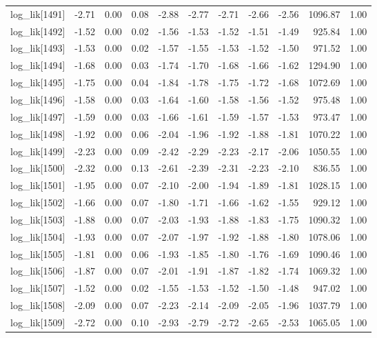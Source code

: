 \begin{table}[ht]
\begin{tabular}{rrrrrrrrrrr}
  log\_lik[1491] & -2.71 & 0.00 & 0.08 & -2.88 & -2.77 & -2.71 & -2.66 & -2.56 & 1096.87 & 1.00 \\ 
  log\_lik[1492] & -1.52 & 0.00 & 0.02 & -1.56 & -1.53 & -1.52 & -1.51 & -1.49 & 925.84 & 1.00 \\ 
  log\_lik[1493] & -1.53 & 0.00 & 0.02 & -1.57 & -1.55 & -1.53 & -1.52 & -1.50 & 971.52 & 1.00 \\ 
  log\_lik[1494] & -1.68 & 0.00 & 0.03 & -1.74 & -1.70 & -1.68 & -1.66 & -1.62 & 1294.90 & 1.00 \\ 
  log\_lik[1495] & -1.75 & 0.00 & 0.04 & -1.84 & -1.78 & -1.75 & -1.72 & -1.68 & 1072.69 & 1.00 \\ 
  log\_lik[1496] & -1.58 & 0.00 & 0.03 & -1.64 & -1.60 & -1.58 & -1.56 & -1.52 & 975.48 & 1.00 \\ 
  log\_lik[1497] & -1.59 & 0.00 & 0.03 & -1.66 & -1.61 & -1.59 & -1.57 & -1.53 & 973.47 & 1.00 \\ 
  log\_lik[1498] & -1.92 & 0.00 & 0.06 & -2.04 & -1.96 & -1.92 & -1.88 & -1.81 & 1070.22 & 1.00 \\ 
  log\_lik[1499] & -2.23 & 0.00 & 0.09 & -2.42 & -2.29 & -2.23 & -2.17 & -2.06 & 1050.55 & 1.00 \\ 
  log\_lik[1500] & -2.32 & 0.00 & 0.13 & -2.61 & -2.39 & -2.31 & -2.23 & -2.10 & 836.55 & 1.00 \\ 
  log\_lik[1501] & -1.95 & 0.00 & 0.07 & -2.10 & -2.00 & -1.94 & -1.89 & -1.81 & 1028.15 & 1.00 \\ 
  log\_lik[1502] & -1.66 & 0.00 & 0.07 & -1.80 & -1.71 & -1.66 & -1.62 & -1.55 & 929.12 & 1.00 \\ 
  log\_lik[1503] & -1.88 & 0.00 & 0.07 & -2.03 & -1.93 & -1.88 & -1.83 & -1.75 & 1090.32 & 1.00 \\ 
  log\_lik[1504] & -1.93 & 0.00 & 0.07 & -2.07 & -1.97 & -1.92 & -1.88 & -1.80 & 1078.06 & 1.00 \\ 
  log\_lik[1505] & -1.81 & 0.00 & 0.06 & -1.93 & -1.85 & -1.80 & -1.76 & -1.69 & 1090.46 & 1.00 \\ 
  log\_lik[1506] & -1.87 & 0.00 & 0.07 & -2.01 & -1.91 & -1.87 & -1.82 & -1.74 & 1069.32 & 1.00 \\ 
  log\_lik[1507] & -1.52 & 0.00 & 0.02 & -1.55 & -1.53 & -1.52 & -1.50 & -1.48 & 947.02 & 1.00 \\ 
  log\_lik[1508] & -2.09 & 0.00 & 0.07 & -2.23 & -2.14 & -2.09 & -2.05 & -1.96 & 1037.79 & 1.00 \\ 
  log\_lik[1509] & -2.72 & 0.00 & 0.10 & -2.93 & -2.79 & -2.72 & -2.65 & -2.53 & 1065.05 & 1.00 \\ 

\end{tabular}
\end{table}
